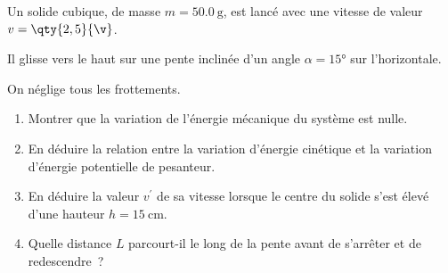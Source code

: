 \begin{minipage}{0.62\linewidth}
    Un solide cubique, de masse $m=\qty{50,0}{\gram}$, est lancé avec
    une vitesse de valeur $v=\qty{2,5}{\v}$.
    
    Il glisse vers le haut sur une pente inclinée d'un angle $\alpha=\ang{15}$ sur
    l'horizontale.
    
    On néglige tous les frottements.

\end{minipage}
\hfill
\begin{minipage}{0.37\linewidth}
    \flushright
\end{minipage}

\begin{enumerate}
    \item Montrer que la variation de l'énergie mécanique du système est nulle.
    \item En déduire la relation entre la variation d'énergie cinétique et la
          variation d'énergie potentielle de pesanteur.
    \item En déduire la valeur $v^{\prime}$ de sa vitesse lorsque le centre
          du solide s'est élevé d’une hauteur $h=\qty{15}{\cm}$.
    \item Quelle distance $L$ parcourt-il le long de la pente
          avant de s'arrêter et de redescendre~?
\end{enumerate}

